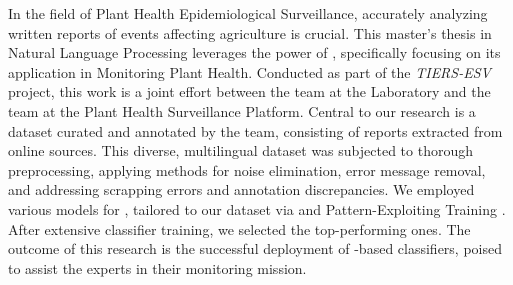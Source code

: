 In the field of Plant Health Epidemiological Surveillance, accurately analyzing written reports of events affecting agriculture is crucial. This master's thesis in Natural Language Processing leverages the power of \textclassification{}, specifically focusing on its application in Monitoring Plant Health. Conducted as part of the \emph{TIERS-ESV} project, this work is a joint effort between the \bibliome{} team at the \INRAE{} Laboratory and the \VSI{} team at the \PESV{} Plant Health Surveillance Platform. 
Central to our research is a dataset curated and annotated by the \VSI{} team, consisting of reports extracted from online sources.
This diverse, multilingual dataset was subjected to thorough preprocessing, applying methods for noise elimination, error message removal, and addressing scrapping errors and annotation discrepancies.
We employed various \BERT{} models for \textclassification{}, tailored to our dataset via \finetuning{} and Pattern-Exploiting Training .
After extensive classifier training, we selected the top-performing ones. 
The outcome of this research is the successful deployment of \BERT{}-based classifiers, poised to assist the \VSI{} experts in their monitoring mission.
